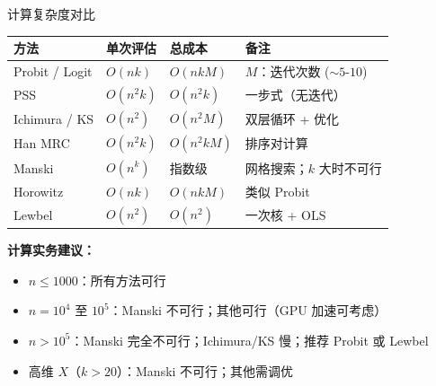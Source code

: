 \documentclass[aspectratio=169, 10pt]{beamer}
\begin{document}
\begin{frame}{计算复杂度对比}

  \begin{center}\footnotesize
  \begin{tabular}{p{2.8cm}|p{2.5cm}|p{2.5cm}|p{4cm}}
  \hline
  方法 & 单次评估 & 总成本 & 备注 \\
  \hline
  Probit / Logit & $O(n k)$ & $O(n k M)$ & $M$：迭代次数 ($\sim 5$-$10$) \\
  PSS & $O(n^2 k)$ & $O(n^2 k)$ & 一步式（无迭代）\\
  Ichimura / KS & $O(n^2)$ & $O(n^2 M)$ & 双层循环 + 优化 \\
  Han MRC & $O(n^2 k)$ & $O(n^2 k M)$ & 排序对计算 \\
  Manski & $O(n^k)$ & 指数级 & 网格搜索；$k$ 大时不可行 \\
  Horowitz & $O(n k)$ & $O(n k M)$ & 类似 Probit \\
  Lewbel & $O(n^2)$ & $O(n^2)$ & 一次核 + OLS \\
  \hline
  \end{tabular}
  \end{center}

  \begin{highlightbox}
    \textbf{计算实务建议：}
    \begin{itemize}\setlength{\itemsep}{1pt}
      \item $n \leq 1000$：所有方法可行
      \item $n = 10^4$ 至 $10^5$：Manski 不可行；其他可行（GPU 加速可考虑）
      \item $n > 10^5$：Manski 完全不可行；Ichimura/KS 慢；推荐 Probit 或 Lewbel
      \item 高维 $X$（$k > 20$）：Manski 不可行；其他需调优
    \end{itemize}
  \end{highlightbox}

\end{frame}
\end{document}
